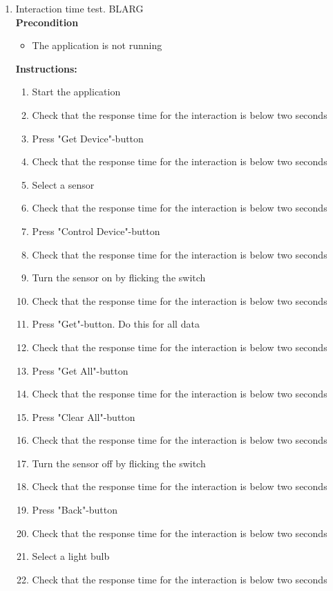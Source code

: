 \documentclass[a4paper]{article}
\newlength{\testlabellength}
\newenvironment{testlist}{\begin{enumerate}[label=\bfseries Instruction \thesubsection.\arabic* , labelindent=0pt, labelwidth=\testlabellength , leftmargin=2cm]}{\end{enumerate}}
\newenvironment{precondition}{
{\color{white}BLARG}\\ 
\textbf{Precondition}
\begin{itemize}[labelindent=0cm, labelwidth=2cm , leftmargin=1cm]
}
{\end{itemize}}
\newenvironment{instruction}{
\textbf{Instructions:}
\begin{enumerate}[label=\bfseries  \arabic*., labelindent=0cm, labelwidth=2cm , leftmargin=1cm]
}
{\end{enumerate}}
\begin{document}
\begin{appendices}
\begin{testlist}
	\item Interaction time test.
		\begin{precondition}
			\item The application is not running
		\end{precondition}
		\begin{instruction}
			\item Start the application
			\item Check that the response time for the interaction is below two seconds
            \item Press "Get Device"-button
            \item Check that the response time for the interaction is below two seconds
            \item Select a sensor
            \item Check that the response time for the interaction is below two seconds
            \item Press "Control Device"-button
            \item Check that the response time for the interaction is below two seconds
            \item Turn the sensor on by flicking the switch
            \item Check that the response time for the interaction is below two seconds
            \item Press "Get"-button. Do this for all data
            \item Check that the response time for the interaction is below two seconds
            \item Press "Get All"-button
            \item Check that the response time for the interaction is below two seconds
            \item Press "Clear All"-button
            \item Check that the response time for the interaction is below two seconds
            \item Turn the sensor off by flicking the switch
            \item Check that the response time for the interaction is below two seconds
            \item Press "Back"-button
            \item Check that the response time for the interaction is below two seconds
            \item Select a light bulb
            \item Check that the response time for the interaction is below two seconds

\end{instruction}
\end{testlist}
\end{appendices}
\end{document}
